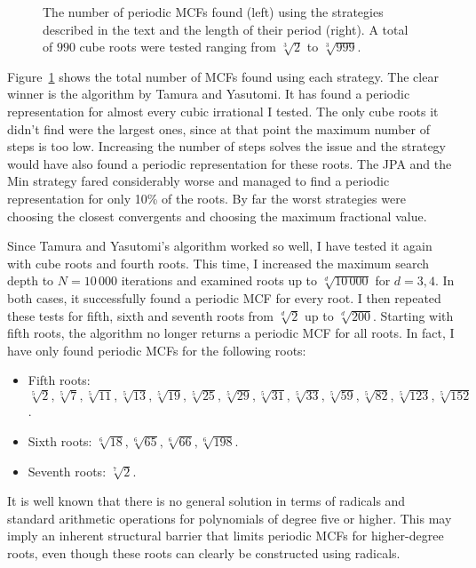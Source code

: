 \begin{figure}[tbp]
  \centering
  
  \caption{
    The number of periodic MCFs found (left) using the strategies described in the
    text and the length of their period (right).
    A total of $990$ cube roots were tested ranging from $\sqrt[3]{2}$ to $\sqrt[3]{999}$.
  }
  \label{fig:comparison}
\end{figure}

Figure~\ref{fig:comparison} shows the total number of MCFs found using each strategy.
The clear winner is the algorithm by Tamura and Yasutomi.
It has found a periodic representation for almost every cubic irrational I tested.
The only cube roots it didn't find were the largest ones,
since at that point the maximum number of steps is too low.
Increasing the number of steps solves the issue and the strategy would have
also found a periodic representation for these roots.
The JPA and the Min strategy fared considerably worse and managed to find a
periodic representation for only 10\% of the roots.
By far the worst strategies were choosing the closest convergents and choosing
the maximum fractional value.

Since Tamura and Yasutomi's algorithm worked so well,
I have tested it again with cube roots and fourth roots.
This time, I increased the maximum search depth to $N = 10\,000$ iterations
and examined roots up to $\sqrt[d]{10\,000}$ for $d=3,4$.
In both cases, it successfully found a periodic MCF for every root.
I then repeated these tests for fifth, sixth and seventh roots
from $\sqrt[d]{2}$ up to $\sqrt[d]{200}$.
Starting with fifth roots, the algorithm no longer returns a periodic MCF for all roots.
In fact, I have only found periodic MCFs for the following roots:
\begin{itemize}
  \item Fifth roots:
    $\sqrt[5]{2}, \sqrt[5]{7}, \sqrt[5]{11}, \sqrt[5]{13}, \sqrt[5]{19},
    \sqrt[5]{25}, \sqrt[5]{29}, \sqrt[5]{31}, \sqrt[5]{33}, \sqrt[5]{59},
    \sqrt[5]{82}, \sqrt[5]{123}, \sqrt[5]{152}$.
  \item Sixth roots: $\sqrt[6]{18}, \sqrt[6]{65}, \sqrt[6]{66},\sqrt[6]{198}$.
  \item Seventh roots: $\sqrt[7]{2}$.
\end{itemize}
It is well known that there is no general solution in terms of radicals and
standard arithmetic operations for polynomials of degree five or higher.
This may imply an inherent structural barrier that limits periodic MCFs for
higher-degree roots, even though these roots can clearly be constructed using
radicals.

